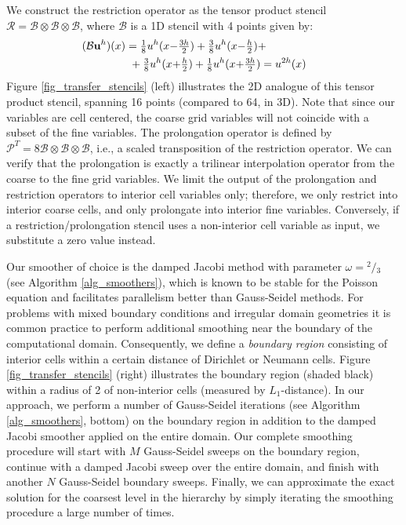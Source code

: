 We construct the restriction operator as the tensor product stencil $\mathcal{R}\!=\!\mathcal{B}\otimes\mathcal{B}\otimes\mathcal{B}$, where $\mathcal{B}$ is a 1D stencil with 4 points
given by:
\begin{align*}
&(\mathcal{B}\vec{u}^h)(x)=\mbox{$\frac{1}{8}$}u^h(x\mbox{$-$}\mbox{$\frac{3h}{2}$})+\mbox{$\frac{3}{8}$}u^h(x\mbox{$-$}\mbox{$\frac{h}{2}$})+\hspace*{.6in}&\\
&\hspace*{.6in}+\mbox{$\frac{3}{8}$}u^h(x\mbox{$+$}\mbox{$\frac{h}{2}$})+\mbox{$\frac{1}{8}$}u^h(x\mbox{$+$}\mbox{$\frac{3h}{2}$})=u^{2h}(x)&
\end{align*}
Figure \ref{fig_transfer_stencils} (left) illustrates the 2D analogue of this tensor product stencil, spanning 16 points (compared to 64, in 3D). Note that since our variables are cell
centered, the coarse grid variables will not coincide with a subset of the fine variables. The prolongation operator is defined by
$\mathcal{P}^T\!=\!8\mathcal{B}\otimes\mathcal{B}\otimes\mathcal{B}$, i.e., a scaled transposition of the restriction operator. We can verify that the prolongation is exactly a trilinear
interpolation operator from the coarse to the fine grid variables. We limit the output of the prolongation and restriction operators to interior cell variables only; therefore, we only
restrict into interior coarse cells, and only prolongate into interior fine variables. Conversely, if a restriction/prolongation stencil uses a non-interior cell variable as input, we
substitute a zero value instead.

Our smoother of choice is the damped Jacobi method with parameter $\omega\!=\!^2\!\!/\!_3$ (see Algorithm \ref{alg_smoothers}), which is known to be stable for the Poisson equation and
facilitates parallelism better than Gauss-Seidel methods. For problems with mixed boundary conditions and irregular domain geometries it is common practice to perform additional
smoothing near the boundary of the computational domain. Consequently, we define a \emph{boundary region} consisting of interior cells within a certain distance of Dirichlet or Neumann
cells. Figure \ref{fig_transfer_stencils} (right) illustrates the boundary region (shaded black) within a radius of 2 of non-interior cells (measured by $L_1$-distance). In our approach,
we perform a number of Gauss-Seidel iterations (see Algorithm \ref{alg_smoothers}, bottom) on the boundary region in addition to the damped Jacobi smoother applied on the entire
domain. Our complete smoothing procedure will start with $M$ Gauss-Seidel sweeps on the boundary region, continue with a damped Jacobi sweep over the entire domain, and finish
with another $N$ Gauss-Seidel boundary sweeps. Finally, we can approximate the exact solution for the coarsest level in the hierarchy by simply iterating the smoothing procedure a large
number of times.

